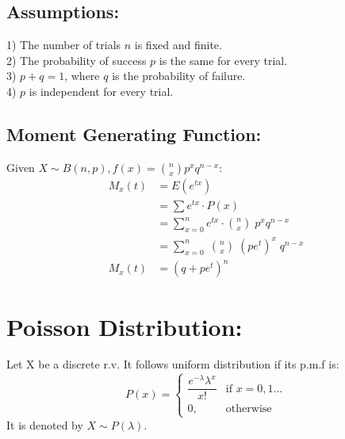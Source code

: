 \documentclass[
10pt, %
a4paper, %
]{report}
\begin{document}
\subsection*{Assumptions:}
1) The number of trials \(n\) is fixed and finite. \\
2) The probability of success \(p\) is the same for every trial. \\
3) \(p+q=1\), where \(q\) is the probability of failure. \\
4) \(p\) is independent for every trial.

\subsection*{Moment Generating Function:}
Given \(X \sim B(n, p), f(x)=\binom{n}{x} p^x q^{n-x}:\)
\begin{align*}
    M_x(t) &= E(e^{tx}) \\
           &= \sum e^{tx} \cdot P(x) \\
           &= \sum_{x=0}^n e^{tx} \cdot \binom{n}{x} \; p^x q^{n-x} \\
           &= \sum_{x=0}^n \; \binom{n}{x} \; (pe^t)^x \; q^{n-x}\\
    M_x(t) &= (q+pe^t)^n
\end{align*}

\newpage

\section*{Poisson Distribution:}

Let X be a discrete r.v. It follows uniform distribution if its p.m.f is:
\[
    P(x)= 
\begin{cases}
    \dfrac{e^{-\lambda} \lambda^x}{x!}        & \text{if } x = 0,1\dots\\
    0,                              & \text{otherwise}
\end{cases}
\]
It is denoted by \(X \sim P(\lambda).\)
\end{document}
